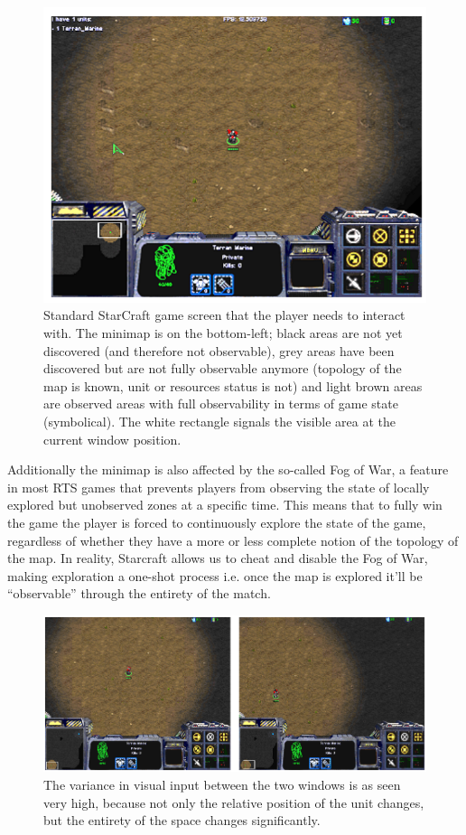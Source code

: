 \documentclass[bsc,frontabs,twoside,singlespacing,parskip,deptreport]{infthesis}     %
\begin{document}
\begin{figure}[h]
    \centering
    \includegraphics[width=\textwidth]{star_one}
    \caption{Standard StarCraft game screen that the player needs to interact
      with. The minimap is on the bottom-left; black areas are not yet
      discovered (and therefore not observable), grey areas have been discovered
      but are not fully observable anymore (topology of the map is known, unit
      or resources status is not) and light brown areas are observed areas with
      full observability in terms of game state (symbolical). The white
      rectangle signals the visible area at the current window position.}
    \label{fig:one_star}
\end{figure}

Additionally the minimap is also affected by the so-called Fog of War, a feature
in most RTS games that prevents players from observing the state of locally
explored but unobserved zones at a specific time. This means that to fully win
the game the player is forced to continuously explore the state of the game,
regardless of whether they have a more or less complete notion of the topology
of the map. In reality, Starcraft allows us to cheat and disable the Fog of War,
making exploration a one-shot process i.e. once the map is explored it’ll be
“observable” through the entirety of the match.

\begin{figure}[h]
    \centering
    \includegraphics[width=\textwidth]{double_star}
    \caption{The variance in visual input between the two windows is as seen
      very high, because not only the relative position of the unit changes, but
      the entirety of the space changes significantly.}
    \label{fig:double_star}
\end{figure}
\end{document}
